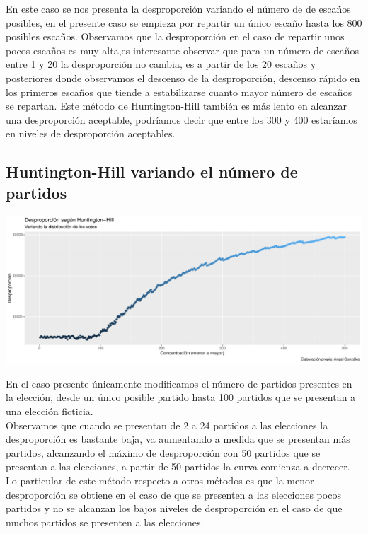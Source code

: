 \documentclass[12pt,a4paper,]{book}
\numberwithin{dummy}{section}
\theoremstyle{ocrenumbox}
\theoremstyle{blacknumex}
\theoremstyle{blacknumbox}
\theoremstyle{ocrenum}
\theoremstyle{ocrenum}
\begin{document}
En este caso se nos presenta la desproporción variando el número de de
escaños posibles, en el presente caso se empieza por repartir un único
escaño hasta los 800 posibles escaños. Observamos que la desproporción
en el caso de repartir unos pocos escaños es muy alta,es interesante
observar que para un número de escaños entre 1 y 20 la desproporción no
cambia, es a partir de los 20 escaños y posteriores donde observamos el
descenso de la desproporción, descenso rápido en los primeros escaños
que tiende a estabilizarse cuanto mayor número de escaños se repartan.
Este método de Huntington-Hill también es más lento en alcanzar una
desproporción aceptable, podríamos decir que entre los 300 y 400
estaríamos en niveles de desproporción aceptables.

\hypertarget{huntington-hill-variando-el-nuxfamero-de-partidos}{%
\subsection{Huntington-Hill variando el número de
partidos}\label{huntington-hill-variando-el-nuxfamero-de-partidos}}

\begin{center}\includegraphics[width=0.95\linewidth]{figurasR/unnamed-chunk-34-1} \end{center}

En el caso presente únicamente modificamos el número de partidos
presentes en la elección, desde un único posible partido hasta 100
partidos que se presentan a una elección ficticia.\\
Observamos que cuando se presentan de 2 a 24 partidos a las elecciones
la desproporción es bastante baja, va aumentando a medida que se
presentan más partidos, alcanzando el máximo de desproporción con 50
partidos que se presentan a las elecciones, a partir de 50 partidos la
curva comienza a decrecer.\\
Lo particular de este método respecto a otros métodos es que la menor
desproporción se obtiene en el caso de que se presenten a las elecciones
pocos partidos y no se alcanzan los bajos niveles de desproporción en el
caso de que muchos partidos se presenten a las elecciones.
\end{document}
